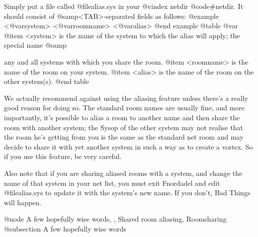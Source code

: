 Simply put a file called @file{alias.sys} in your
@vindex netdir
@code{#netdir}.
It should consist of @samp{<TAB>}-separated fields as follows:
@example
<@var{system}> <@var{roomname}> <@var{alias}>
@end example
@table @var
@item <system>
is the name of the system to which the alias
will apply; the special name @samp{%
any and all systems with which you share the room.
@item <roomname>
is the name of the room on your system.
@item <alias>
is the name of the room on the other system(s).
@end table

We actually recommend against using the aliasing feature
unless there's a really good reason for doing so.  The standard
room names are usually fine, and more importantly, it's possible
to alias a room to another name and then share the room with
another system; the Sysop of the other system may not realise that
the room he's getting from you is the same as the standard net
room and may decide to share it with yet another system in such a
way as to create a vortex.  So if you use this feature, be very
careful.

Also note that if you are sharing aliased rooms with a system, and
change the name of that system in your net list, you must exit
Fnordadel and edit @file{alias.sys} to update it with the system's
new name.  If you don't, Bad Things will happen.

@node A few hopefully wise words,  , Shared room aliasing, Roomsharing
@subsection A few hopefully wise words

}
